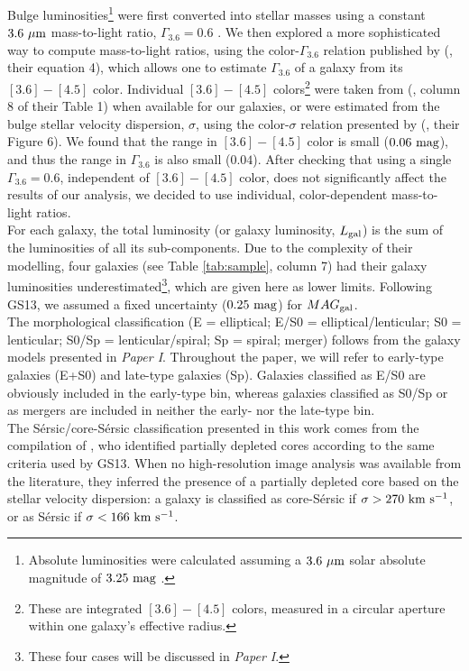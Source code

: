 \documentclass[preprint2]{emulateapj}
\begin{document}
Bulge luminosities\footnote{Absolute luminosities were calculated 
assuming a $3.6\rm~\mu m$ solar absolute magnitude of $3.25\rm~mag$ \citep{sani2011}.} 
were first converted into stellar masses using a constant $3.6\rm~\mu m$ mass-to-light ratio, $\Gamma_{3.6} = 0.6$ \citep{meidt2014}.
We then explored a more sophisticated way to compute mass-to-light ratios, 
using the color-$\Gamma_{3.6}$ relation published by 
\citeauthor{meidt2014} (\citeyear{meidt2014}, their equation 4), 
which allows one to estimate $\Gamma_{3.6}$ of a galaxy from its $[3.6] - [4.5]$ color. 
Individual $[3.6] - [4.5]$ colors\footnote{These are integrated $[3.6] - [4.5]$ colors, measured in a circular aperture 
within one galaxy's effective radius.} were taken from 
\citeauthor{peletier2012} (\citeyear{peletier2012}, column 8 of their Table 1) 
when available for our galaxies, 
or were estimated from the bulge stellar velocity dispersion, $\sigma$, 
using the color-$\sigma$ relation presented by \citeauthor{peletier2012} (\citeyear{peletier2012}, their Figure 6).
We found that the range in $[3.6] - [4.5]$ color is small ($0.06\rm~mag$), 
and thus the range in $\Gamma_{3.6}$ is also small ($0.04$).
After checking that using a single $\Gamma_{3.6} = 0.6$, independent of $[3.6] - [4.5]$ color, 
does not significantly affect the results of our analysis, 
we decided to use individual, color-dependent mass-to-light ratios. \\
For each galaxy, the total luminosity (or galaxy luminosity, $L_{\rm gal}$) is the sum of the luminosities of all its sub-components. 
Due to the complexity of their modelling, 
four galaxies (see Table \ref{tab:sample}, column 7) had their galaxy luminosities 
underestimated\footnote{These four cases will be discussed in \emph{Paper I}.}, 
which are given here as lower limits. 
Following GS13, we assumed a fixed uncertainty ($0.25\rm~mag$) for $MAG_{\rm gal}$. \\
The morphological classification (E = elliptical; E/S0 = elliptical/lenticular; S0 = lenticular; S0/Sp = lenticular/spiral; Sp = spiral; merger) 
follows from the galaxy models presented in \emph{Paper I}. 
Throughout the paper, we will refer to early-type galaxies (E+S0) and late-type galaxies (Sp). 
Galaxies classified as E/S0 are obviously included in the early-type bin, 
whereas galaxies classified as S0/Sp or as mergers are included in neither the early- nor the late-type bin.\\
The S\'ersic/core-S\'ersic classification presented in this work 
comes from the compilation of \citet{savorgnangraham2015},
who identified partially depleted cores according to the same criteria used by GS13.
When no high-resolution image analysis was available from the literature, 
they inferred the presence of a partially depleted core based on the stellar velocity dispersion:
a galaxy is classified as core-S\'ersic if $\sigma > 270\rm~km~s^{-1}$,
or as S\'ersic if $\sigma < 166\rm~km~s^{-1}$. \\
\end{document}
